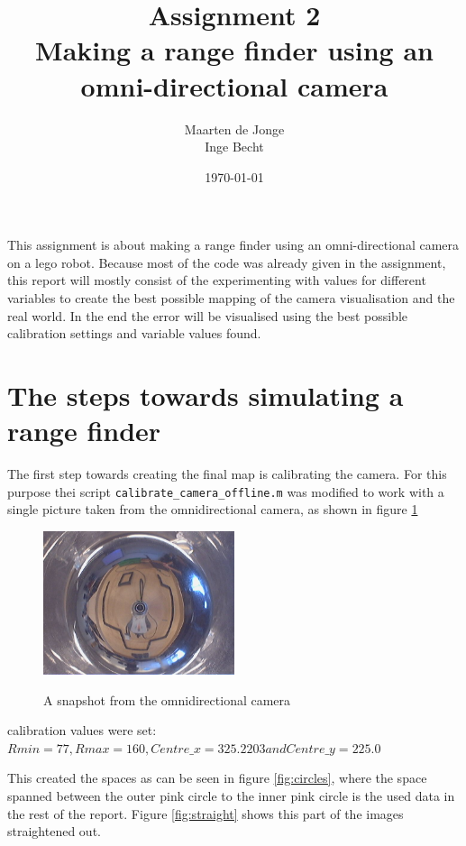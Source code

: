 \documentclass[a4paper, 20pt]{article}
\author{Maarten de Jonge \\
    Inge Becht}
\date{\today}
\title{Assignment 2\\ 
Making a range finder using an omni-directional camera }
\begin{document}
\maketitle

This assignment is about making a range finder using an omni-directional
camera on a lego robot. 
Because most of the code was already given in the assignment, this report
will mostly consist of the experimenting with values for different variables to
create the best possible mapping of the camera visualisation and the real world.
In the end the error will be visualised using the best possible calibration
settings and variable values found.

\section{The steps towards simulating a range finder}

The first step towards creating the final map is calibrating the camera. For
this purpose thei script \texttt{calibrate\_camera\_offline.m} was modified to
work with a single picture taken from the omnidirectional camera, as shown in
figure \ref{fig:snapshot}


\begin{figure}[!ht]
\centering
  \includegraphics[width=0.5\textwidth]{omni_snapshot.jpg}
  \label{fig:snapshot}
  \caption{A snapshot from the omnidirectional camera}
\end{figure}

calibration values were set: $Rmin = 77,Rmax = 160, Centre\_x = 325.2203 and
Centre\_y =  225.0$

This created the spaces as can be seen in figure \ref{fig:circles}, where the space spanned between the
outer pink circle to
the inner pink circle is the used data in the rest of the report. Figure
\ref{fig:straight} shows this part of the images straightened out.
\end{document}
